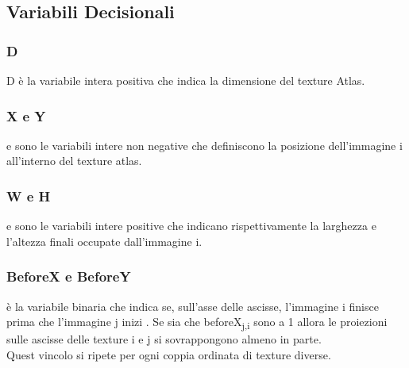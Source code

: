 \newcommand{\footBleeding}{L'effetto bleeding si può manifestare nei programmi che sfruttano l'accelerazione hardware. In essi i pixel vengono presi con delle coordinate reali in [0,1] e i pixel subito fuori dall'immagine possono "sporcare" quelli di contorno. Perciò si ricopiano questi ultimi in un bordo di 1 pixel attorno a tutta l'immagine.}
\newcommand{\footRotation}{Spiegare differenza opengl et sim. Verso solo sw.}
\newcommand{\footTwoPowers}{Alcune librerie spesso esigono immagini quadrate il cui lato dev'essere una potenze di 2.}






\subsection{Variabili Decisionali}

\subsubsection{D}
D è la variabile intera positiva che indica la dimensione del texture Atlas.

\subsubsection{X e Y}
\Xi{} e \Yi{} sono le variabili intere non negative che definiscono la posizione dell'immagine i all'interno del texture atlas.

\subsubsection{W e H}
\Wi{} e \Hi{} sono le variabili intere positive che indicano rispettivamente la larghezza e l'altezza finali occupate dall'immagine i.


\subsubsection{BeforeX e BeforeY}


\hbox{\vrule height1cm width8cm depth0cm}

{\beforeXij} è la variabile binaria che indica se, sull'asse delle ascisse, l'immagine i finisce prima che l'immagine j inizi 
. Se sia \beforeXij{} che beforeX\textsubscript{j,i} sono a 1  allora le proiezioni sulle ascisse delle texture i e j si sovrappongono almeno in parte. \\
Quest vincolo si ripete per ogni coppia ordinata di texture diverse.
%

